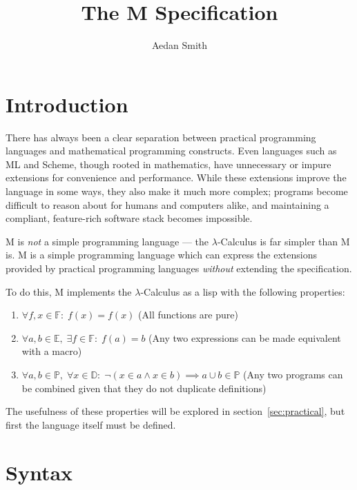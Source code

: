 \documentclass{article}
\title{The M Specification}
\author{Aedan Smith}
\begin{document}
    \maketitle
    \newpage

    \tableofcontents
    \newpage

    \section{Introduction}\label{sec:introduction}

    There has always been a clear separation between practical programming languages and mathematical programming constructs.
    Even languages such as ML and Scheme, though rooted in mathematics, have unnecessary or impure extensions for convenience and performance.
    While these extensions improve the language in some ways, they also make it much more complex;
    programs become difficult to reason about for humans and computers alike, and maintaining a compliant, feature-rich software stack becomes impossible.

    M is \textit{not} a simple programming language --- the $\lambda$-Calculus is far simpler than M is.
    M is a simple programming language which can express the extensions provided by practical programming languages \textit{without} extending the specification.

    To do this, M implements the $\lambda$-Calculus as a lisp with the following properties:
    \begin{enumerate}
        \item $\forall f, x\in\mathbb{F}:\;f(x)=f(x)$ (All functions are pure)
        \item $\forall a, b\in\mathbb{E},\;\exists f\in\mathbb{F}:\;f(a)=b$ (Any two expressions can be made equivalent with a macro)
        \item $\forall a, b\in\mathbb{P},\;\forall x\in\mathbb{D}:\;\neg(x\in a\land x\in b)\implies a\cup b\in\mathbb{P}$ (Any two programs can be combined given that they do not duplicate definitions)
    \end{enumerate}

    The usefulness of these properties will be explored in section~\ref{sec:practical}, but first the language itself must be defined.
    \newpage

    \section{Syntax}\label{sec:syntax}
\end{document}
